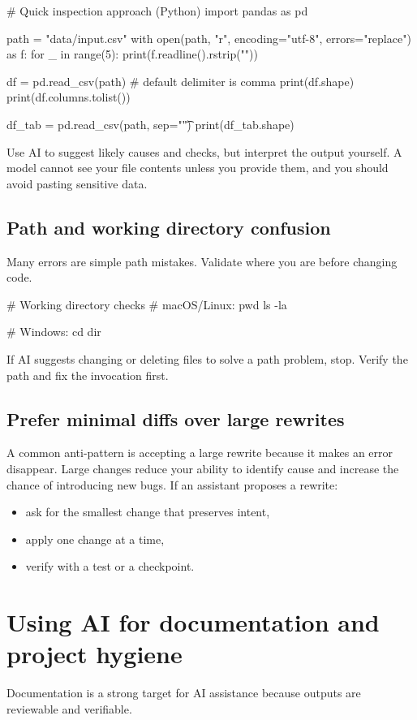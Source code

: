 \begin{fullcode}
# Quick inspection approach (Python)
import pandas as pd

path = "data/input.csv"
with open(path, "r", encoding="utf-8", errors="replace") as f:
    for _ in range(5):
        print(f.readline().rstrip("\n"))

df = pd.read_csv(path)              # default delimiter is comma
print(df.shape)
print(df.columns.tolist())

df_tab = pd.read_csv(path, sep="\t")
print(df_tab.shape)
\end{fullcode}

Use AI to suggest likely causes and checks, but interpret the output yourself. A model cannot see your file contents unless you provide them, and you should avoid pasting sensitive data.

\subsection{Path and working directory confusion}
Many errors are simple path mistakes. Validate where you are before changing code.
\begin{fullcode}
# Working directory checks
# macOS/Linux:
pwd
ls -la

# Windows:
cd
dir
\end{fullcode}

If AI suggests changing or deleting files to solve a path problem, stop. Verify the path and fix the invocation first.

\subsection{Prefer minimal diffs over large rewrites}
A common anti-pattern is accepting a large rewrite because it makes an error disappear. Large changes reduce your ability to identify cause and increase the chance of introducing new bugs. If an assistant proposes a rewrite:
\begin{itemize}[noitemsep]
  \item ask for the smallest change that preserves intent,
  \item apply one change at a time,
  \item verify with a test or a checkpoint.
\end{itemize}

\section{Using AI for documentation and project hygiene}
Documentation is a strong target for AI assistance because outputs are reviewable and verifiable.

